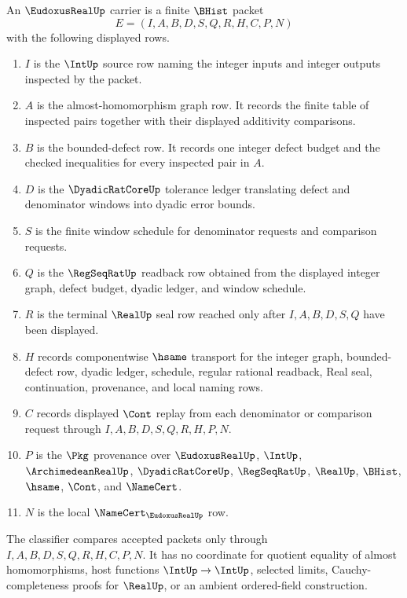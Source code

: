 \begin{definition}
\label{def:eudoxus-real-carrier}
An $\EudoxusRealUp$ carrier is a finite $\BHist$ packet
$$
E=(I,A,B,D,S,Q,R,H,C,P,N)
$$
with the following displayed rows.
\begin{enumerate}
\item $I$ is the $\IntUp$ source row naming the integer inputs and integer outputs inspected by the packet.
\item $A$ is the almost-homomorphism graph row. It records the finite table of inspected pairs together with their displayed additivity comparisons.
\item $B$ is the bounded-defect row. It records one integer defect budget and the checked inequalities for every inspected pair in $A$.
\item $D$ is the $\DyadicRatCoreUp$ tolerance ledger translating defect and denominator windows into dyadic error bounds.
\item $S$ is the finite window schedule for denominator requests and comparison requests.
\item $Q$ is the $\RegSeqRatUp$ readback row obtained from the displayed integer graph, defect budget, dyadic ledger, and window schedule.
\item $R$ is the terminal $\RealUp$ seal row reached only after $I,A,B,D,S,Q$ have been displayed.
\item $H$ records componentwise $\hsame$ transport for the integer graph, bounded-defect row, dyadic ledger, schedule, regular rational readback, Real seal, continuation, provenance, and local naming rows.
\item $C$ records displayed $\Cont$ replay from each denominator or comparison request through $I,A,B,D,S,Q,R,H,P,N$.
\item $P$ is the $\Pkg$ provenance over $\EudoxusRealUp$, $\IntUp$, $\ArchimedeanRealUp$, $\DyadicRatCoreUp$, $\RegSeqRatUp$, $\RealUp$, $\BHist$, $\hsame$, $\Cont$, and $\NameCert$.
\item $N$ is the local $\NameCert_{\EudoxusRealUp}$ row.
\end{enumerate}
The classifier compares accepted packets only through $I,A,B,D,S,Q,R,H,C,P,N$. It has no coordinate for quotient equality of almost homomorphisms, host functions $\IntUp\to\IntUp$, selected limits, Cauchy-completeness proofs for $\RealUp$, or an ambient ordered-field construction.
\end{definition}

